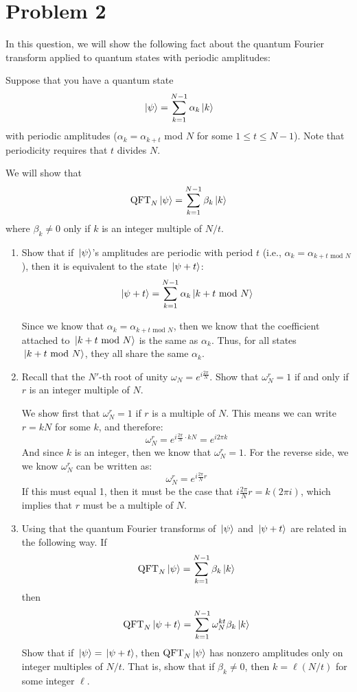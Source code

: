 \documentclass[10pt]{article}
\begin{document}
	\section*{Problem 2}
	In this question, we will show the following fact about the quantum Fourier transform applied to quantum states 
	with periodic amplitudes:

	Suppose that you have a quantum state 
	\[
	\ket*{\psi} = \sum_{k=1}^{N-1} \alpha_k \ket*{k}
	\] 
	with periodic amplitudes (\( \alpha_k = \alpha_{k + t} \) mod \( N \) for some \( 1 \le t \le N-1 \)). Note that 
	periodicity requires that \( t \) divides \( N \). 

	We will show that 
	\[
	\text{QFT}_N\ket*{\psi} = \sum_{k=1}^{N-1} \beta_k \ket*{k}
	\] 
	where \( \beta_k \neq 0  \) only if \( k \) is an integer multiple of \( N/t \).
	\begin{enumerate}[label=\alph*)]
		\item Show that if \( \ket*{\psi} \)'s amplitudes are periodic with period \( t \) (i.e., 
			\( \alpha_k = \alpha_{k + t \text{ mod } N} \)), then it is equivalent to the state 
			\( \ket*{\psi + t } \):
			\[
			\ket*{\psi + t} = \sum_{k=1}^{N-1} \alpha_k \ket*{k + t \ \text{mod }N}
			\] 

			\begin{solution}
				Since we know that \( \alpha_k = \alpha_{k + t \text{ mod } N} \), then we know that the coefficient 
				attached to \( \ket*{k + t \text{ mod } N}  \) is the same as \( \alpha_k \). Thus, for all 
				states \( \ket*{k + t \text{ mod } N} \), they all share the same \( \alpha_k \). 
			\end{solution}
		\item Recall that the \( N' \)-th root of unity \( \omega_N = e^{i \frac{2\pi}{N}}\). Show that 
			\( \omega_N^{r} = 1 \) if and only if \( r \) is an integer multiple of \( N \). 

			\begin{solution}
				We show first that \( \omega_N^{r} = 1 \) if \( r  \) is a multiple of \( N \).  This means we can 
				write \( r = kN \) for some \( k \), and therefore:
				\[
				\omega_N^{r} = e^{i \frac{2\pi}{N} \cdot kN} = e^{i 2 \pi k}
				\] 
				And since \( k \) is an integer, then we know that \( \omega_N^{r} = 1 \). For the reverse side, 
				we we know  \( \omega_N^{r} \) can be written as:
				\[
				\omega_N ^{r} = e^{i \frac{2\pi}{N} r}
				\] 
				If this must equal 1, then it must be the case that \( i \frac{2\pi}{N} r = k (2\pi i) \), 
				which implies that \( r \) must be a multiple of \( N \). 
			\end{solution}
		\item Using that the quantum Fourier transforms of \( \ket*{\psi} \) and \( \ket*{\psi + t} \) are 
			related in the following way. If 
			\[
			\text{QFT}_N \ket*{\psi} = \sum_{k=1}^{N-1} \beta_k \ket*{k}
			\] 
			then 
			\[
			\text{QFT}_N \ket*{\psi + t} = \sum_{k=1}^{N-1} \omega_N^{kt}\beta_k \ket*{k}
			\] 
			Show that if \( \ket*{\psi} = \ket*{\psi + t} \), then \( \text{QFT}_N\ket*{\psi} \) has nonzero 
			amplitudes only on integer multiples of \( N / t \). That is, show that if \( \beta_k \neq 0 \), 
			then \( k = \ell (N / t) \) for some integer \( \ell \). 


\end{enumerate}
\end{document}
